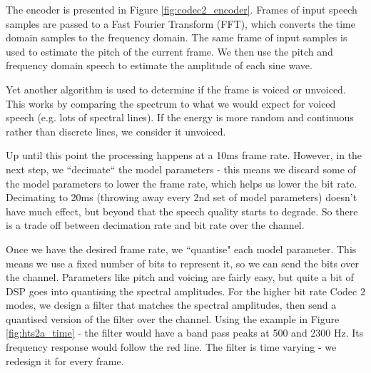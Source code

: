 \documentclass{article}
\begin{document}
{\begin{figure}[h]
\begin{center}
\end{center}
\end{figure}

The encoder is presented in Figure \ref{fig:codec2_encoder}.  Frames of input speech samples are passed to a Fast Fourier Transform (FFT), which converts the time domain samples to the frequency domain.  The same frame of input samples is used to estimate the pitch of the current frame. We then use the pitch and frequency domain speech to estimate the amplitude of each sine wave.

Yet another algorithm is used to determine if the frame is voiced or unvoiced.  This works by comparing the spectrum to what we would expect for voiced speech (e.g. lots of spectral lines).  If the energy is more random and continuous rather than discrete lines, we consider it unvoiced.

Up until this point the processing happens at a 10ms frame rate.  However, in the next step, we ``decimate`` the model parameters - this means we discard some of the model parameters to lower the frame rate, which helps us lower the bit rate.  Decimating to 20ms (throwing away every 2nd set of model parameters) doesn't have much effect, but beyond that the speech quality starts to degrade.  So there is a trade off between decimation rate and bit rate over the channel.

Once we have the desired frame rate, we ``quantise" each model parameter.  This means we use a fixed number of bits to represent it, so we can send the bits over the channel.  Parameters like pitch and voicing are fairly easy, but quite a bit of DSP goes into quantising the spectral amplitudes. For the higher bit rate Codec 2 modes, we design a filter that matches the spectral amplitudes, then send a quantised version of the filter over the channel. Using the example in Figure \ref{fig:hts2a_time} - the filter would have a band pass peaks at 500 and 2300 Hz.  Its frequency response would follow the red line. The filter is time varying - we redesign it for every frame.

}
\end{document}
